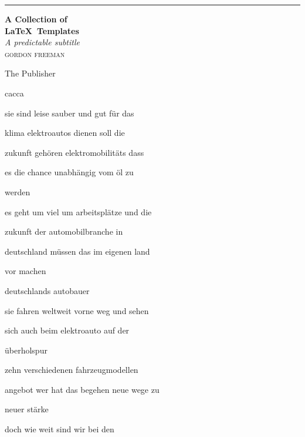 \documentclass[a4paper, 11pt]{book} %
\newcommand*{\plogo}{\fbox{$\mathcal{PL}$}} %
\begin{document}
\begin{titlepage} %
	
	\raggedleft %
	
	\rule{1pt}{\textheight} %
	\hspace{0.05\textwidth} %
	\parbox[b]{0.75\textwidth}{ %
		
		{\Huge\bfseries A Collection of \\[0.5\baselineskip] \LaTeX ~Templates}\\[2\baselineskip] %
		{\large\textit{A predictable subtitle}}\\[4\baselineskip] %
		{\Large\textsc{gordon freeman}} %
		
		\vspace{0.5\textheight} %
		
		{\noindent The Publisher~~\plogo}\\[\baselineskip] %
	}
cacca
\end{titlepage}
sie sind leise sauber und gut für das

klima elektroautos dienen soll die

zukunft gehören elektromobilitäts dass

es die chance unabhängig vom öl zu

werden

es geht um viel um arbeitsplätze und die

zukunft der automobilbranche in

deutschland müssen das im eigenen land

vor machen

deutschlands autobauer

sie fahren weltweit vorne weg und sehen

sich auch beim elektroauto auf der

überholspur

zehn verschiedenen fahrzeugmodellen

angebot wer hat das begehen neue wege zu

neuer stärke

doch wie weit sind wir bei den
\end{document}
